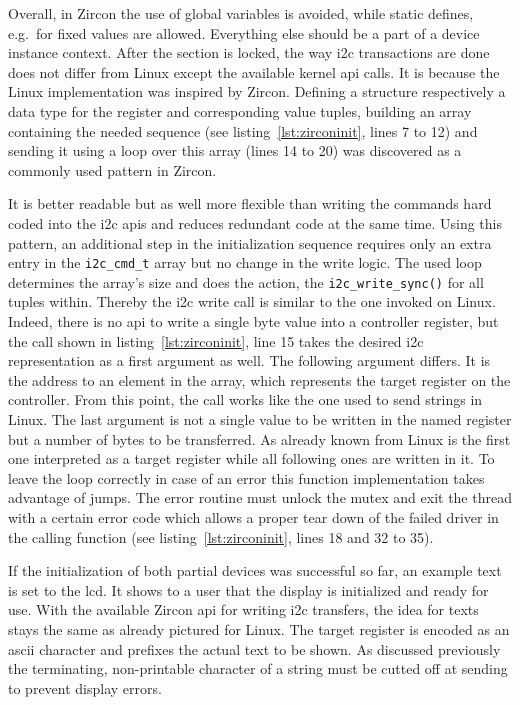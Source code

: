 Overall, in Zircon the use of global variables is avoided, while static defines, e.g.\ for fixed values are allowed.
Everything else should be a part of a device instance context.
After the section is locked, the way \ac{i2c} transactions are done does not differ from Linux except the available kernel \ac{api} calls.
It is because the Linux implementation was inspired by Zircon.
Defining a structure respectively a data type for the register and corresponding value tuples, building an array containing the needed sequence (see listing~\ref{lst:zirconinit}, lines 7 to 12) and sending it using a loop over this array (lines 14 to 20) was discovered as a commonly used pattern in Zircon.


It is better readable but as well more flexible than writing the commands hard coded into the \ac{i2c} \acp{api} and reduces redundant code at the same time.
Using this pattern, an additional step in the initialization sequence requires only an extra entry in the \texttt{i2c_cmd_t} array but no change in the write logic.
The used loop determines the array's size and does the action, the \texttt{i2c_write_sync()} for all tuples within.
Thereby the \ac{i2c} write call is similar to the one invoked on Linux.
Indeed, there is no \ac{api} to write a single byte value into a controller register, but the call shown in listing~\ref{lst:zirconinit}, line 15 takes the desired \ac{i2c} representation as a first argument as well.
The following argument differs.
It is the address to an element in the array, which represents the target register on the controller.
From this point, the call works like the one used to send strings in Linux.
The last argument is not a single value to be written in the named register but a number of bytes to be transferred.
As already known from Linux is the first one interpreted as a target register while all following ones are written in it.
To leave the loop correctly in case of an error this function implementation takes advantage of jumps.
The error routine must unlock the mutex and exit the thread with a certain error code which allows a proper tear down of the failed driver in the calling function (see listing~\ref{lst:zirconinit}, lines 18 and 32 to 35).

If the initialization of both partial devices was successful so far, an example text is set to the \ac{lcd}.
It shows to a user that the display is initialized and ready for use.
With the available Zircon \ac{api} for writing \ac{i2c} transfers, the idea for texts stays the same as already pictured for Linux.
The target register is encoded as an \ac{ascii} character and prefixes the actual text to be shown.
As discussed previously the terminating, non-printable character of a string must be cutted off at sending to prevent display errors.

